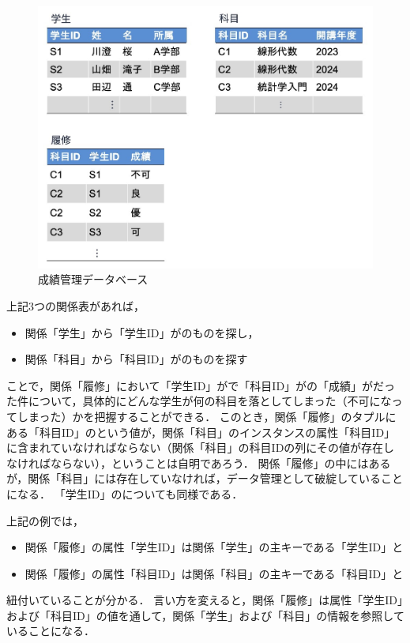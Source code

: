 \begin{figure}[tb]
    \centering
    \includegraphics[width=1.0\textwidth]{figure/score-db.jpg}
    \caption{成績管理データベース}
    \label{fig:score-db}
\end{figure}
上記3つの関係表があれば，
\begin{itemize}
\item 関係「学生」から「学生ID」がのものを探し，
\item 関係「科目」から「科目ID」がのものを探す
\end{itemize}
ことで，関係「履修」において「学生ID」がで「科目ID」がの「成績」がだった件について，具体的にどんな学生が何の科目を落としてしまった（不可になってしまった）かを把握することができる．
このとき，関係「履修」のタプルにある「科目ID」のという値が，関係「科目」のインスタンスの属性「科目ID」に含まれていなければならない（関係「科目」の科目IDの列にその値が存在しなければならない），ということは自明であろう．
関係「履修」の中にはあるが，関係「科目」には存在していなければ，データ管理として破綻していることになる．
「学生ID」のについても同様である．

上記の例では，
\begin{itemize}
\item 関係「履修」の属性「学生ID」は関係「学生」の主キーである「学生ID」と
\item 関係「履修」の属性「科目ID」は関係「科目」の主キーである「科目ID」と
\end{itemize}

紐付いていることが分かる．
言い方を変えると，関係「履修」は属性「学生ID」および「科目ID」の値を通して，関係「学生」および「科目」の情報を参照していることになる．

